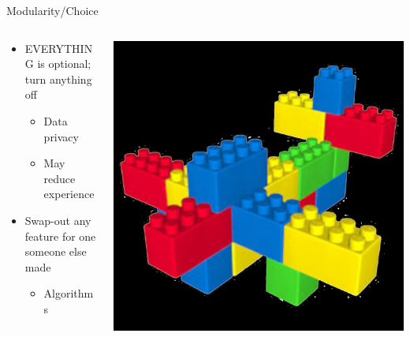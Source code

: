 \documentclass[aspectratio=169]{beamer}
\begin{document}
\begin{frame}{Modularity/Choice}
\begin{columns}[T]
    \begin{column}[T]{0.5\textwidth}
        \begin{itemize}
            \item EVERYTHING is optional; turn anything off
            \begin{itemize}
                \item Data privacy
                \item May reduce experience
            \end{itemize}
            \item Swap-out any feature for one someone else made
            \begin{itemize}
                \item Algorithms
            \end{itemize}
        \end{itemize}
    \end{column}
    \begin{column}{0.5\textwidth}
        \includegraphics[height=0.8\textheight]{imgs/power_to_people/legos.png}
    \end{column}
\end{columns}
\end{frame}
\end{document}
